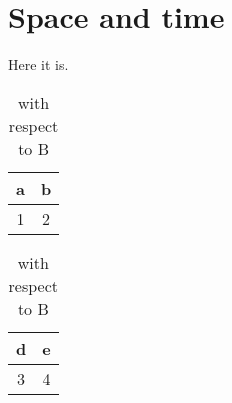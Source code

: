 \section{Space and time}

Here it is.

\begin{table}[h!]
  \parbox{.45\linewidth}{
    \centering
    \begin{tabular}{c|c}
      a&b\\
      \hline
      1&2
    \end{tabular}
    \caption{with respect to A}    
  }
  \hfill
  \parbox{.45\linewidth}{
    \centering
    \begin{tabular}{c|c}
      d&e\\
      \hline
      3&4
    \end{tabular}
    \caption{with respect to B}    
  }
\end{table}